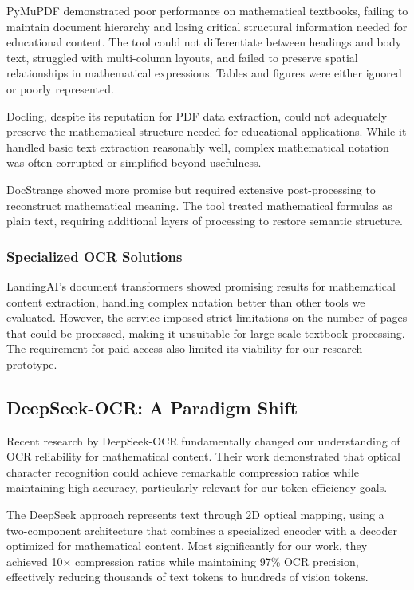 \documentclass[12pt]{article}
\begin{document}
PyMuPDF demonstrated poor performance on mathematical textbooks, failing to maintain document hierarchy and losing critical structural information needed for educational content. The tool could not differentiate between headings and body text, struggled with multi-column layouts, and failed to preserve spatial relationships in mathematical expressions. Tables and figures were either ignored or poorly represented.

Docling, despite its reputation for PDF data extraction, could not adequately preserve the mathematical structure needed for educational applications. While it handled basic text extraction reasonably well, complex mathematical notation was often corrupted or simplified beyond usefulness.

DocStrange showed more promise but required extensive post-processing to reconstruct mathematical meaning. The tool treated mathematical formulas as plain text, requiring additional layers of processing to restore semantic structure.

\subsubsection{Specialized OCR Solutions}

LandingAI's document transformers showed promising results for mathematical content extraction, handling complex notation better than other tools we evaluated. However, the service imposed strict limitations on the number of pages that could be processed, making it unsuitable for large-scale textbook processing. The requirement for paid access also limited its viability for our research prototype.

\subsection{DeepSeek-OCR: A Paradigm Shift}

Recent research by DeepSeek-OCR \cite{deepseek2025} fundamentally changed our understanding of OCR reliability for mathematical content. Their work demonstrated that optical character recognition could achieve remarkable compression ratios while maintaining high accuracy, particularly relevant for our token efficiency goals.

The DeepSeek approach represents text through 2D optical mapping, using a two-component architecture that combines a specialized encoder with a decoder optimized for mathematical content. Most significantly for our work, they achieved 10× compression ratios while maintaining 97\% OCR precision, effectively reducing thousands of text tokens to hundreds of vision tokens.
\end{document}
